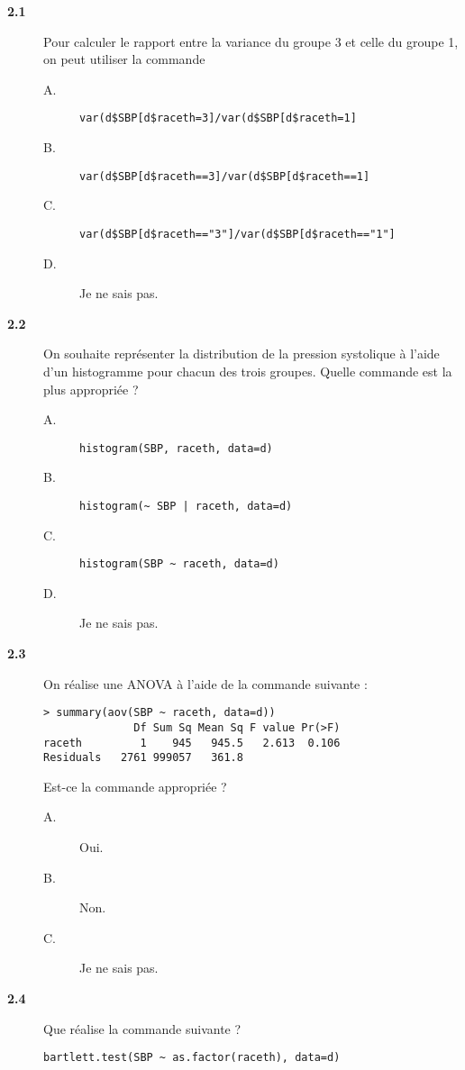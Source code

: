 \documentclass[11pt]{report}
\theoremstyle{definition}
\begin{document}
\begin{description}
\item[\bf 2.1]  Pour calculer le rapport entre la
  variance du groupe 3 et celle du groupe 1, on peut utiliser la commande
\begin{description}
\item[A.] \verb|var(d$SBP[d$raceth=3]/var(d$SBP[d$raceth=1]|
\item[B.] \verb|var(d$SBP[d$raceth==3]/var(d$SBP[d$raceth==1]|
\item[C.] \verb|var(d$SBP[d$raceth=="3"]/var(d$SBP[d$raceth=="1"]|
\item[D.] Je ne sais pas.
\end{description}  
\item[\bf 2.2]  On souhaite représenter la
  distribution de la pression systolique à l'aide d'un histogramme pour
  chacun des trois groupes. Quelle commande est la plus appropriée ?
  \begin{description}
  \item[A.] \verb|histogram(SBP, raceth, data=d)|
  \item[B.] \verb+histogram(~ SBP | raceth, data=d)+
  \item[C.] \verb|histogram(SBP ~ raceth, data=d)|
  \item[D.] Je ne sais pas.
  \end{description}  
\item[\bf 2.3]  On réalise une ANOVA à l'aide de la
  commande suivante :
\begin{verbatim}
> summary(aov(SBP ~ raceth, data=d))
              Df Sum Sq Mean Sq F value Pr(>F)
raceth         1    945   945.5   2.613  0.106
Residuals   2761 999057   361.8
\end{verbatim}
  Est-ce la commande appropriée ?  
  \begin{description}
  \item[A.] Oui.
  \item[B.] Non.
  \item[C.] Je ne sais pas.
  \end{description}  
\item[\bf 2.4]  Que réalise la commande suivante ? 
\begin{verbatim}
bartlett.test(SBP ~ as.factor(raceth), data=d)
\end{verbatim}
  \begin{description}

\end{description}
\end{description}
\end{document}
